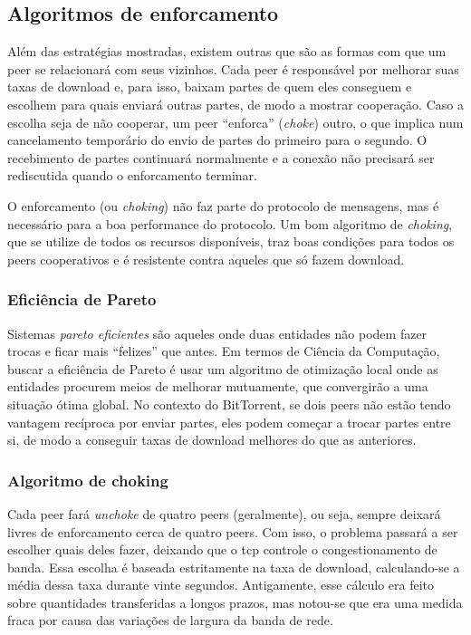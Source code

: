 
\newpage
\subsection*{Algoritmos de enforcamento}

Além das estratégias mostradas, existem outras que são as formas com que um \gls*{peer}
se relacionará com seus vizinhos. Cada \gls*{peer} é responsável por melhorar suas
taxas de download e, para isso, baixam partes de quem eles conseguem e escolhem para
quais enviará outras partes, de modo a mostrar cooperação. Caso a escolha seja de não
cooperar, um \gls*{peer} ``enforca'' (\emph{choke}) outro, o que implica num
cancelamento temporário do envio de partes do primeiro para o segundo. O recebimento de
partes continuará normalmente e a conexão não precisará ser rediscutida quando o
enforcamento terminar.

O enforcamento (ou \emph{choking}) não faz parte do protocolo de mensagens, mas é
necessário para a boa performance do protocolo. Um bom algoritmo de \emph{choking}, que
se utilize de todos os recursos disponíveis, traz boas condições para todos os
\glspl*{peer} cooperativos e é resistente contra aqueles que só fazem download.

\subsubsection*{Eficiência de Pareto}

Sistemas \emph{pareto eficientes} \cite{wiki:pareto} são aqueles onde duas entidades
não podem fazer trocas e ficar mais ``felizes'' que antes. Em termos de Ciência da
Computação, buscar a eficiência de Pareto é usar um algoritmo de otimização local onde
as entidades procurem meios de melhorar mutuamente, que convergirão a uma situação ótima
global. No contexto do BitTorrent, se dois \glspl*{peer} não estão tendo vantagem
recíproca por enviar partes, eles podem começar a trocar partes entre si, de modo a
conseguir taxas de download melhores do que as anteriores.

\subsubsection*{Algoritmo de choking}

Cada \gls*{peer} fará \emph{unchoke} de quatro \glspl*{peer} (geralmente), ou seja,
sempre deixará livres de enforcamento cerca de quatro \glspl*{peer}. Com isso, o
problema passará a ser escolher quais deles fazer, deixando que o \gls*{tcp} controle o
congestionamento de banda. Essa escolha é baseada estritamente na taxa de download,
calculando-se a média dessa taxa durante vinte segundos. Antigamente, esse cálculo era
feito sobre quantidades transferidas a longos prazos, mas notou-se que era uma medida
fraca por causa das variações de largura da banda de rede.

